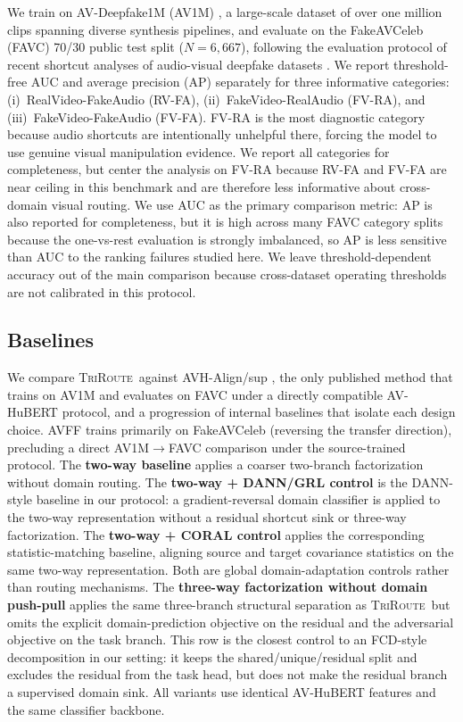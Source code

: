 \documentclass{article}
\newcommand{\method}{\textsc{TriRoute}}
\begin{document}
We train on AV-Deepfake1M (AV1M) \citep{cai2024avdeepfake1m}, a large-scale dataset of over one million clips spanning diverse synthesis pipelines, and evaluate on the FakeAVCeleb (FAVC) \citep{khalid2021fakeavceleb} 70/30 public test split ($N=6{,}667$), following the evaluation protocol of recent shortcut analyses of audio-visual deepfake datasets \citep{smeu2025avhalign}. We report threshold-free AUC and average precision (AP) separately for three informative categories: (i)~RealVideo-FakeAudio (RV-FA), (ii)~FakeVideo-RealAudio (FV-RA), and (iii)~FakeVideo-FakeAudio (FV-FA). FV-RA is the most diagnostic category because audio shortcuts are intentionally unhelpful there, forcing the model to use genuine visual manipulation evidence. We report all categories for completeness, but center the analysis on FV-RA because RV-FA and FV-FA are near ceiling in this benchmark and are therefore less informative about cross-domain visual routing. We use AUC as the primary comparison metric: AP is also reported for completeness, but it is high across many FAVC category splits because the one-vs-rest evaluation is strongly imbalanced, so AP is less sensitive than AUC to the ranking failures studied here. We leave threshold-dependent accuracy out of the main comparison because cross-dataset operating thresholds are not calibrated in this protocol.

\subsection{Baselines}

We compare \method\ against AVH-Align/sup \citep{smeu2025avhalign}, the only published method that trains on AV1M and evaluates on FAVC under a directly compatible AV-HuBERT protocol, and a progression of internal baselines that isolate each design choice. AVFF \citep{oorloff2024avff} trains primarily on FakeAVCeleb (reversing the transfer direction), precluding a direct AV1M$\to$FAVC comparison under the source-trained protocol. The \textbf{two-way baseline} applies a coarser two-branch factorization without domain routing. The \textbf{two-way + DANN/GRL control} is the DANN-style baseline in our protocol: a gradient-reversal domain classifier is applied to the two-way representation without a residual shortcut sink or three-way factorization. The \textbf{two-way + CORAL control} applies the corresponding statistic-matching baseline, aligning source and target covariance statistics on the same two-way representation. Both are global domain-adaptation controls rather than routing mechanisms. The \textbf{three-way factorization without domain push-pull} applies the same three-branch structural separation as \method\ but omits the explicit domain-prediction objective on the residual and the adversarial objective on the task branch. This row is the closest control to an FCD-style decomposition in our setting: it keeps the shared/unique/residual split and excludes the residual from the task head, but does not make the residual branch a supervised domain sink. All variants use identical AV-HuBERT features and the same classifier backbone.
\end{document}
